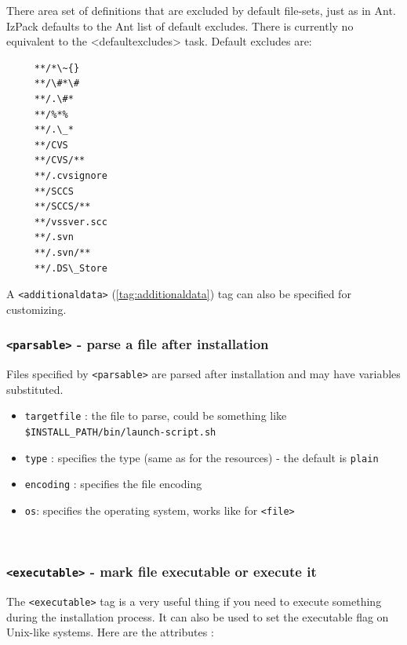 There area set of definitions that are excluded by default file-sets,
just as in Ant. IzPack defaults to the Ant list of default
excludes. There is currently no equivalent to the <defaultexcludes>
task. Default excludes are:
\footnotesize
\begin{verbatim}
     **/*\~{}
     **/\#*\#
     **/.\#*
     **/%*%
     **/.\_*
     **/CVS
     **/CVS/**
     **/.cvsignore
     **/SCCS
     **/SCCS/**
     **/vssver.scc
     **/.svn
     **/.svn/**
     **/.DS\_Store
\end{verbatim}
\normalsize
A \texttt{<additionaldata>} (\ref{tag:additionaldata})
tag can also be specified for customizing.

\subsubsection{\texttt{<parsable>} - parse a file after installation}

Files specified by \texttt{<parsable>} are parsed after installation and may
have variables substituted.

\begin{itemize}

  \item \texttt{targetfile} : the file to parse, could be something like\\
  \texttt{\$INSTALL\_PATH/bin/launch-script.sh}

  \item \texttt{type} : specifies the type (same as for the resources) -
  the default is \texttt{plain}

  \item \texttt{encoding} : specifies the file encoding

  \item \texttt{os}: specifies the operating system, works like for
  \texttt{<file>}

\end{itemize}\

\subsubsection{\texttt{<executable>} - mark file executable or execute it}

The \texttt{<executable>} tag is a very useful thing if you need to execute
something during the installation process. It can also be used to set the
executable flag on Unix-like systems. Here are the attributes :

